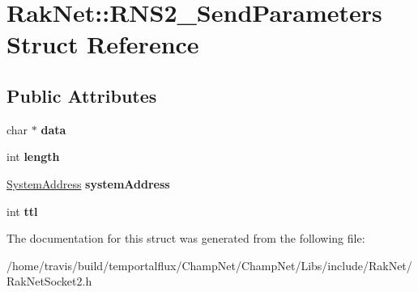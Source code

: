 \hypertarget{struct_rak_net_1_1_r_n_s2___send_parameters}{\section{Rak\-Net\-:\-:R\-N\-S2\-\_\-\-Send\-Parameters Struct Reference}
\label{struct_rak_net_1_1_r_n_s2___send_parameters}
}
\subsection*{Public Attributes}
\begin{DoxyCompactItemize}
\item 
\hypertarget{struct_rak_net_1_1_r_n_s2___send_parameters_ab75ece8d877f2bb1d52293999f3699c9}{char $\ast$ {\bfseries data}}\label{struct_rak_net_1_1_r_n_s2___send_parameters_ab75ece8d877f2bb1d52293999f3699c9}

\item 
\hypertarget{struct_rak_net_1_1_r_n_s2___send_parameters_a49e33fc6cbb719bc2a3964caad9082f3}{int {\bfseries length}}\label{struct_rak_net_1_1_r_n_s2___send_parameters_a49e33fc6cbb719bc2a3964caad9082f3}

\item 
\hypertarget{struct_rak_net_1_1_r_n_s2___send_parameters_ae005d2be6ee66b424dad923bf0fe2c32}{\hyperlink{struct_rak_net_1_1_system_address}{System\-Address} {\bfseries system\-Address}}\label{struct_rak_net_1_1_r_n_s2___send_parameters_ae005d2be6ee66b424dad923bf0fe2c32}

\item 
\hypertarget{struct_rak_net_1_1_r_n_s2___send_parameters_a458fc830ccddee2cf57bb14b249868f2}{int {\bfseries ttl}}\label{struct_rak_net_1_1_r_n_s2___send_parameters_a458fc830ccddee2cf57bb14b249868f2}

\end{DoxyCompactItemize}


The documentation for this struct was generated from the following file\-:\begin{DoxyCompactItemize}
\item 
/home/travis/build/temportalflux/\-Champ\-Net/\-Champ\-Net/\-Libs/include/\-Rak\-Net/Rak\-Net\-Socket2.\-h\end{DoxyCompactItemize}
